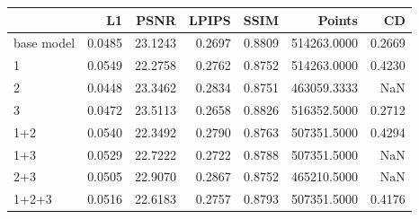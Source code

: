 \begin{tabular}{lrrrrrr}
\toprule
 & L1 & PSNR & LPIPS & SSIM & Points & CD \\
\midrule
base model & 0.0485 & 23.1243 & 0.2697 & 0.8809 & 514263.0000 & 0.2669 \\
1 & 0.0549 & 22.2758 & 0.2762 & 0.8752 & 514263.0000 & 0.4230 \\
2 & 0.0448 & 23.3462 & 0.2834 & 0.8751 & 463059.3333 & NaN \\
3 & 0.0472 & 23.5113 & 0.2658 & 0.8826 & 516352.5000 & 0.2712 \\
1+2 & 0.0540 & 22.3492 & 0.2790 & 0.8763 & 507351.5000 & 0.4294 \\
1+3 & 0.0529 & 22.7222 & 0.2722 & 0.8788 & 507351.5000 & NaN \\
2+3 & 0.0505 & 22.9070 & 0.2867 & 0.8752 & 465210.5000 & NaN \\
1+2+3 & 0.0516 & 22.6183 & 0.2757 & 0.8793 & 507351.5000 & 0.4176 \\
\bottomrule
\end{tabular}
